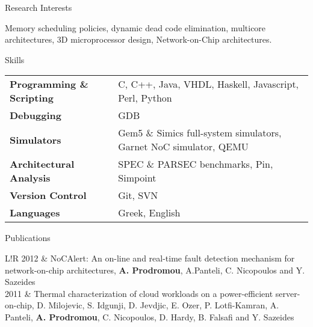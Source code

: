 \documentclass{resume} %
\newcommand\VRule{\color{lightgray}\vrule width 0.5pt}
\begin{document}

\begin{rSection}{Research Interests}

Memory scheduling policies, dynamic dead code elimination, multicore architectures, 3D microprocessor design, Network-on-Chip architectures. \\

\end{rSection}

\begin{rSection}{Skills}

\begin{tabular}{ @{} >{\bfseries}l @{\hspace{6ex}} l }
Programming \& Scripting & C, C++, Java, VHDL, Haskell, Javascript, Perl, Python \\
Debugging & GDB \\
Simulators & Gem5 \& Simics full-system simulators, Garnet NoC simulator, QEMU \\
Architectural Analysis & SPEC \& PARSEC benchmarks, Pin, Simpoint \\
Version Control & Git, SVN \\
Languages & Greek, English\\
\end{tabular}

\end{rSection}



\begin{rSection}{Publications}

\begin{tabular}{L!{\VRule}R}
2012 & NoCAlert: An on-line and real-time fault detection mechanism for network-on-chip architectures, \textbf{A. Prodromou}, A.Panteli, C. Nicopoulos and Y. Sazeides\\[5pt]
2011 & Thermal characterization of cloud workloads on a power-efficient server-on-chip, D. Milojevic, S. Idgunji, D. Jevdjic, E. Ozer, P. Lotfi-Kamran, A. Panteli, \textbf{A. Prodromou}, C. Nicopoulos, D. Hardy, B. Falsafi and Y. Sazeides\\[5pt]
\end{tabular}

\end{rSection}
\end{document}
